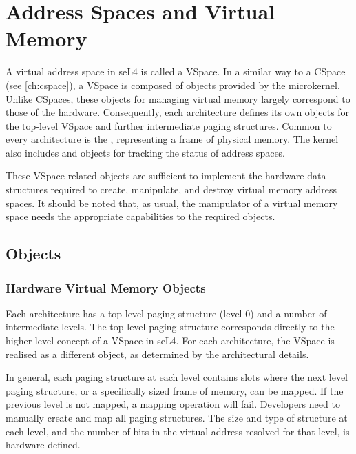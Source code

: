 %
%
%
%

\chapter{\label{ch:vspace}Address Spaces and Virtual Memory}

A virtual address space in seL4 is called a VSpace. In a similar
way to a CSpace (see \autoref{ch:cspace}), a VSpace is composed of objects
provided by the microkernel. Unlike CSpaces, these objects for managing
virtual memory largely correspond to those of the hardware. Consequently,
each architecture defines its own objects for the top-level VSpace and further intermediate paging structures.
Common to every architecture is the , representing a frame of physical memory.
The kernel also includes  and
 objects for tracking the status of address spaces.

These VSpace-related objects are sufficient to implement the
hardware data structures required to create, manipulate, and destroy
virtual memory address spaces. It should be noted that, as usual, the
manipulator of a virtual memory space needs the appropriate
capabilities to the required objects.

\section{Objects}

\subsection{Hardware Virtual Memory Objects}

Each architecture has a top-level paging structure (level 0) and a number of intermediate levels.
The top-level paging structure corresponds directly to the higher-level concept of a VSpace in seL4.
For each architecture, the VSpace is realised as a different object, as determined by the
architectural details.

In general, each paging structure at each level contains slots where the next level paging structure,
or a specifically sized frame of memory, can be mapped. If the previous level is not mapped,
a mapping operation will fail. Developers need to manually create and map all paging structures.
The size and type of structure at each level, and the number of bits in the virtual address resolved
for that level, is hardware defined.

